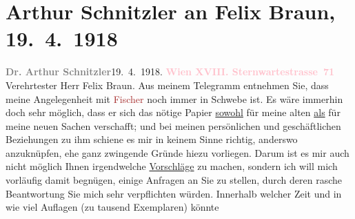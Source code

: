 

               \section[Arthur Schnitzler an Felix Braun, 19. 4. 1918]{ Arthur Schnitzler an Felix Braun, 19. 4. 1918}\nopagebreak{}\rehead{ }\normalsize\beginnumbering{} \toendnotes[C]{\smallbreak\pagebreak[2]} 
\toendnotes[C]{\smallbreak}\pstart
           {\pb}\textcolor{gray}{\textbf{Dr. Arthur Schnitzler}}\hfill 19. 4. 1918.\pend
           \pstart
           \textcolor{gray}{\textbf{\textcolor{pink}{Wien XVIII. Sternwartestrasse 71}{}\ledrightnote{\textcolor{pink}{Sternwartestraße}}}}\pend
           \pstart\center{}Verehrtester Herr Felix Braun.\pend\pstart
           Aus meinem Telegramm entnehmen Sie, dass meine Angelegenheit mit \textcolor{brown}{Fischer}{}\ledrightnote{\textcolor{brown}{S. Fischer Verlag}} noch immer in Schwebe ist. Es wäre immerhin doch
                    sehr möglich, dass er sich das nötige Papier \uline{sowohl} für meine alten \uline{als} für meine
                    neuen Sachen verschafft; und bei meinen persönlichen und geschäftlichen
                    Beziehungen zu ihm schiene es mir in keinem Sinne richtig, anderswo anzuknüpfen,
                    ehe ganz zwingende Gründe hiezu vorliegen. Darum ist es mir auch nicht möglich
                    Ihnen \introOben{}irgend\introOben{}welche \uline{Vorschläge} zu machen, sondern ich will mich vorläufig damit begnügen,
                         einige Anfragen an Sie zu stellen, durch
                    deren rasche Beantwortung Sie mich sehr verpflichten würden.\pend
           \pstart
           Innerhalb welcher Zeit und in wie viel Auflagen (zu tausend Exemplaren) könnte
